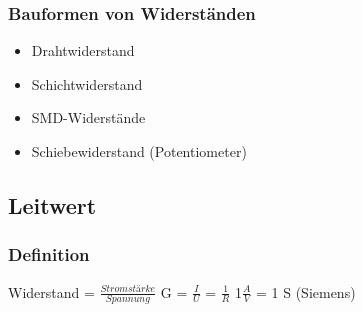 \documentclass[../../main.tex]{subfiles}
\begin{document}
\subsubsection{Bauformen von Widerständen}
\begin{itemize}
    \item Drahtwiderstand
    \item Schichtwiderstand
    \item SMD-Widerstände
    \item Schiebewiderstand (Potentiometer)
\end{itemize}

\subsection{Leitwert}
\subsubsection{Definition}
Widerstand = $\frac{Stromstärke}{Spannung}$ \newline
G = $\frac{I}{U}$ \newline
[G] = $\frac{1}{R}$ 1$\frac{A}{V}$ = 1 S (Siemens) \newline
\end{document}
